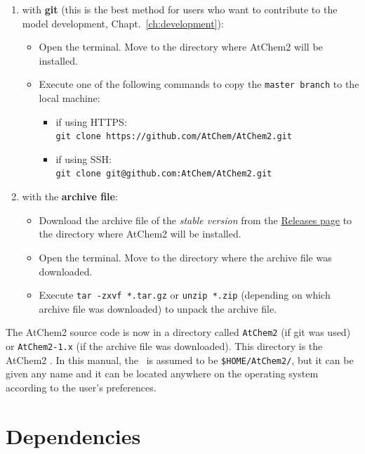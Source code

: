 \begin{enumerate}
\item with \textbf{git} (this is the best method for users who want to contribute to the model
  development, Chapt.~\ref{ch:development}):
  \begin{itemize}
  \item Open the terminal. Move to the directory where AtChem2 will be installed.
  \item Execute one of the following commands to copy the \texttt{master\ branch} to the local
    machine:
    \begin{itemize}
    \item if using HTTPS:\\
      \verb|git clone https://github.com/AtChem/AtChem2.git|
    \item if using SSH:\\
      \verb|git clone git@github.com:AtChem/AtChem2.git|
    \end{itemize}
  \end{itemize}
\item with the \textbf{archive file}:
  \begin{itemize}
  \item Download the archive file of the \emph{stable version} from the
    \href{https://github.com/AtChem/AtChem2/releases}{Releases page} to the directory where
    AtChem2 will be installed.
  \item Open the terminal. Move to the directory where the archive file was downloaded.
  \item Execute \verb|tar -zxvf *.tar.gz| or \verb|unzip *.zip| (depending on which archive
    file was downloaded) to unpack the archive file.
  \end{itemize}
\end{enumerate}

The AtChem2 source code is now in a directory called \texttt{AtChem2} (if git was used) or
\texttt{AtChem2-1.x} (if the archive file was downloaded). This directory is the AtChem2
\maindir. In this manual, the \maindir\ is assumed to be \texttt{\$HOME/AtChem2/}, but it can
be given any name and it can be located anywhere on the operating system according to the
user's preferences.

\section{Dependencies} \label{sec:dependencies}

